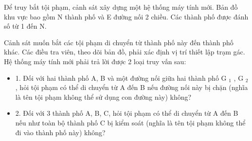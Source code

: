 Để truy bắt tội phạm, cảnh sát xây dựng một hệ thống máy tính mới. Bản đồ khu vực bao gồm N thành phố và E đường nối 2 chiều. Các thành phố được đánh số từ 1 đến N.  

   Cảnh sát muốn bắt các tội phạm di chuyển từ thành phố này đến thành phố khác. Các điều tra viên, theo dõi bản đồ, phải xác định vị trí thiết lập trạm gác. Hệ thống máy tính mới phải trả lời được 2 loại   truy vấn sau:  
\begin{itemize}
	\item     1. Đối với hai thành phố A, B và một đường nối giữa hai thành phố G    $_     1    $    , G    $_     2    $    , hỏi tội phạm có thể di chuyển từ A đến B nếu đường nối này bị chặn (nghĩa là tên tội phạm không   thể sử dụng con đường này) không?   
	\item     2. Đối với 3 thành phố A, B, C, hỏi tội phạm có thể di chuyển từ A đến B nếu như toàn bộ thành phố C bị kiểm soát (nghĩa là tên tội phạm không thể đi vào thành phố này) không?   
\end{itemize}